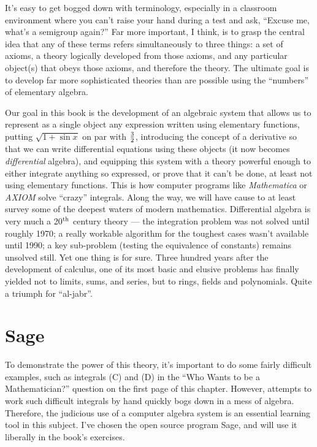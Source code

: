 It's easy to get bogged down with terminology, especially in a
classroom environment where you can't raise your hand during a test
and ask, ``Excuse me, what's a semigroup again?''  Far more important,
I think, is to grasp the central idea that any of these terms refers
simultaneously to three things: a set of axioms, a theory logically
developed from those axioms, and any particular object(s) that obeys
those axioms, and therefore the theory.  The ultimate goal is to
develop far more sophisticated theories than are possible using the
``numbers'' of elementary algebra.

Our goal in this book is the development of an algebraic system that
allows us to represent as a single object any expression written using
elementary functions, putting $\sqrt{1 + \sin x}$ on par with
$3\over2$, introducing the concept of a derivative so that we can
write differential equations using these objects (it now becomes {\it
differential} algebra), and equipping this system with a theory
powerful enough to either integrate anything so expressed, or prove
that it can't be done, at least not using elementary functions.  This
is how computer programs like {\it Mathematica} or {\it AXIOM} solve
``crazy'' integrals.  Along the way, we will have cause to
at least survey some of the deepest waters of modern
mathematics.  Differential algebra is very much a 20$^{\rm th}$
century theory --- the integration problem was not solved until
roughly 1970; a really workable algorithm for the toughest cases
wasn't available until 1990; a key sub-problem (testing the
equivalence of constants) remains unsolved still.  Yet one thing is
for sure.  Three hundred years after the development of calculus, one
of its most basic and elusive problems has finally yielded not to
limits, sums, and series, but to rings, fields and polynomials.  Quite a
triumph for ``al-jabr''.

\vfill\eject
\section{Sage}

To demonstrate the power of this theory, it's important to do some
fairly difficult examples, such as integrals (C) and (D) in the ``Who
Wants to be a Mathematician?'' question on the first page of this
chapter.  However, attempts to work such difficult integrals by hand
quickly bogs down in a mess of algebra.  Therefore, the judicious use
of a computer algebra system is an essential learning tool in this
subject.  I've chosen the open source program Sage, and will use it
liberally in the book's exercises.

